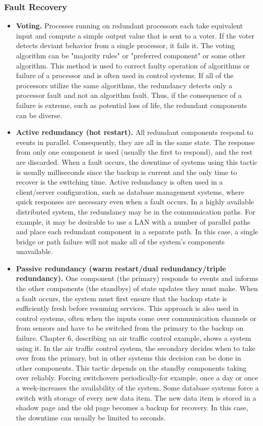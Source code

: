 \documentclass[a4paper]{article}
\begin{document}
\subsubsection{Fault Recovery}
  \begin{itemize}
  \item
    \textbf{Voting.}
    Processes running on redundant processors each take equivalent input and compute a simple output value that is sent to a voter. If the voter detects deviant behavior from a single processor, it fails it. The voting algorithm can be "majority rules" or "preferred component" or some other algorithm. This method is used to correct faulty operation of algorithms or failure of a processor and is often used in control systems. If all of the processors utilize the same algorithms, the redundancy detects only a processor fault and not an algorithm fault. Thus, if the consequence of a failure is extreme, such as potential loss of life, the redundant components can be diverse.
  \item
    \textbf{Active redundancy (hot restart).}
    All redundant components respond to events in parallel. Consequently, they are all in the same state. The response from only one component is used (usually the first to respond), and the rest are discarded. When a fault occurs, the downtime of systems using this tactic is usually milliseconds since the backup is current and the only time to recover is the switching time. Active redundancy is often used in a client/server configuration, such as database management systems, where quick responses are necessary even when a fault occurs. In a highly available distributed system, the redundancy may be in the communication paths. For example, it may be desirable to use a LAN with a number of parallel paths and place each redundant component in a separate path. In this case, a single bridge or path failure will not make all of the system's components unavailable.
  \item
    \textbf{Passive redundancy (warm restart/dual redundancy/triple redundancy).}
    One component (the primary) responds to events and informs the other components (the standbys) of state updates they must make. When a fault occurs, the system must first ensure that the backup state is sufficiently fresh before resuming services. This approach is also used in control systems, often when the inputs come over communication channels or from sensors and have to be switched from the primary to the backup on failure. Chapter 6, describing an air traffic control example, shows a system using it. In the air traffic control system, the secondary decides when to take over from the primary, but in other systems this decision can be done in other components. This tactic depends on the standby components taking over reliably. Forcing switchovers periodically-for example, once a day or once a week-increases the availability of the system. Some database systems force a switch with storage of every new data item. The new data item is stored in a shadow page and the old page becomes a backup for recovery. In this case, the downtime can usually be limited to seconds.

\end{itemize}
\end{document}

